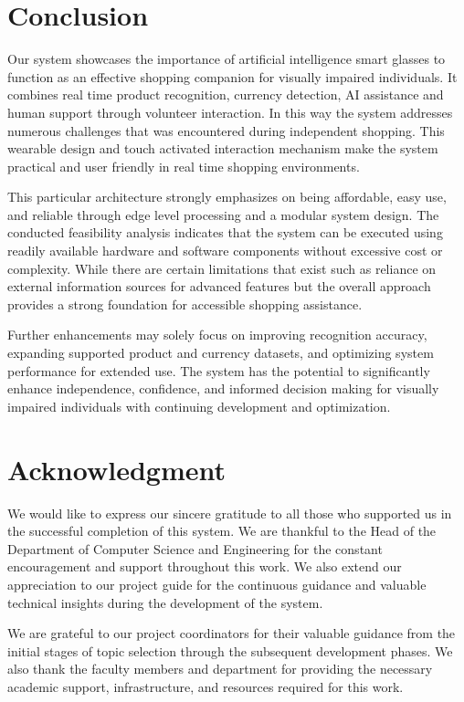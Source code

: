 \documentclass[conference]{IEEEtran}
\begin{document}
\section{Conclusion}
Our system showcases the importance of artificial intelligence smart glasses to function as an effective shopping companion for visually impaired individuals. It combines real time product recognition, currency detection, AI assistance and human support through volunteer interaction. In this way the system addresses numerous challenges that was encountered during independent shopping. This wearable design and touch activated interaction mechanism make the system practical and user friendly in real time shopping environments.

This particular architecture strongly emphasizes on being affordable, easy use, and reliable through edge level processing and a modular system design. The conducted feasibility analysis indicates that the system can be executed using readily available hardware and software components without excessive cost or complexity. While there are certain limitations that exist such as reliance on external information sources for advanced features but the overall approach provides a strong foundation for accessible shopping assistance.

Further enhancements may solely focus on improving recognition accuracy, expanding supported product and currency datasets, and optimizing system performance for extended use. The system has the potential to significantly enhance independence, confidence, and informed decision making for visually impaired individuals with continuing development and optimization.


\section*{Acknowledgment}

We would like to express our sincere gratitude to all those who supported us in the successful completion of this system. We are thankful to the Head of the Department of Computer Science and Engineering for the constant encouragement and support throughout this work. We also extend our appreciation to our project guide for the continuous guidance and valuable technical insights during the development of the system.

We are grateful to our project coordinators for their valuable guidance from the initial stages of topic selection through the subsequent development phases. We also thank the faculty members and department for providing the necessary academic support, infrastructure, and resources required for this work.
\end{document}
